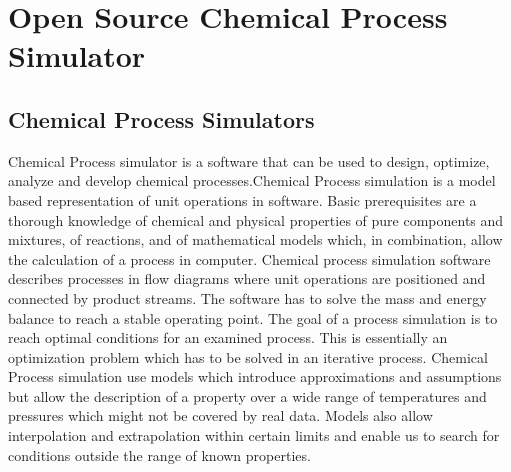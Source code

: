 \documentclass[12pt]{report}
\begin{document}
\chapter{Open Source Chemical Process Simulator}

\section{Chemical Process Simulators}
Chemical Process simulator is a software that can be used to design, optimize, analyze and develop chemical processes.Chemical Process simulation is a model based representation of unit operations in software. Basic prerequisites   are a thorough knowledge of chemical and physical properties of pure components and mixtures, of reactions, and of mathematical models which, in combination, allow the calculation of a process in computer.
Chemical process simulation software describes processes in flow diagrams where unit operations are positioned and connected by product streams. The software has to solve the mass and energy balance to reach a stable operating point. The goal of a process simulation is to reach optimal conditions for an examined process. This is essentially an optimization problem which has to be solved in an iterative process.
Chemical Process simulation use models which introduce approximations and assumptions but allow the description of a property over a wide range of temperatures and pressures which might not be covered by real data. Models also allow interpolation and extrapolation within certain limits and enable us to search for conditions outside the range of known properties.
\end{document}
